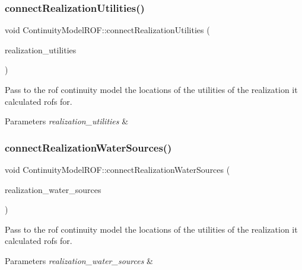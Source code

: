 \subsubsection{\texorpdfstring{connect\+Realization\+Utilities()}{connectRealizationUtilities()}}
{\footnotesize\ttfamily void Continuity\+Model\+R\+O\+F\+::connect\+Realization\+Utilities (\begin{DoxyParamCaption}\item[{const vector$<$ \mbox{\hyperlink{classUtility}{Utility}} $\ast$$>$ \&}]{realization\+\_\+utilities }\end{DoxyParamCaption})}

Pass to the rof continuity model the locations of the utilities of the realization it calculated rofs for. 
\begin{DoxyParams}{Parameters}
{\em realization\+\_\+utilities} & \\
\hline
\end{DoxyParams}
\mbox{\label{classContinuityModelROF_a0c12b5dad97c3783361baad7e53a2634_a0c12b5dad97c3783361baad7e53a2634}} 
\subsubsection{\texorpdfstring{connect\+Realization\+Water\+Sources()}{connectRealizationWaterSources()}}
{\footnotesize\ttfamily void Continuity\+Model\+R\+O\+F\+::connect\+Realization\+Water\+Sources (\begin{DoxyParamCaption}\item[{const vector$<$ \mbox{\hyperlink{classWaterSource}{Water\+Source}} $\ast$$>$ \&}]{realization\+\_\+water\+\_\+sources }\end{DoxyParamCaption})}

Pass to the rof continuity model the locations of the utilities of the realization it calculated rofs for. 
\begin{DoxyParams}{Parameters}
{\em realization\+\_\+water\+\_\+sources} & \\
\hline
\end{DoxyParams}
\mbox{\label{classContinuityModelROF_ab4a793f312b693d98c80e4b9545a8bb5_ab4a793f312b693d98c80e4b9545a8bb5}} 
